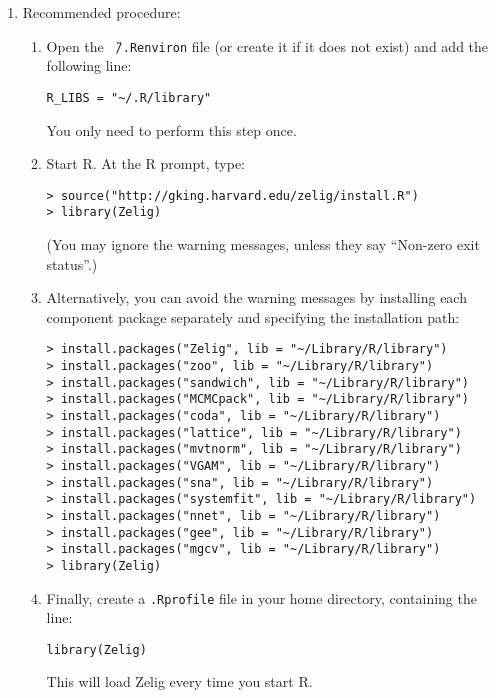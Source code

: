 \begin{enumerate}
\item Recommended procedure: 
  \begin{enumerate}
  \item Open the {\tt \~\,/.Renviron} file (or create it if it does
    not exist) and add the following line:
\begin{verbatim}
R_LIBS = "~/.R/library"
\end{verbatim}
    You only need to perform this step once.
  \item Start R.  At the R prompt, type:
\begin{verbatim}
> source("http://gking.harvard.edu/zelig/install.R")
> library(Zelig)
\end{verbatim}
(You may ignore the warning messages, unless they say ``Non-zero exit 
status''.)
\item Alternatively, you can avoid the warning messages by installing each 
component package separately and specifying the installation path:  
\begin{verbatim}
> install.packages("Zelig", lib = "~/Library/R/library")
> install.packages("zoo", lib = "~/Library/R/library")
> install.packages("sandwich", lib = "~/Library/R/library")
> install.packages("MCMCpack", lib = "~/Library/R/library")
> install.packages("coda", lib = "~/Library/R/library")
> install.packages("lattice", lib = "~/Library/R/library")
> install.packages("mvtnorm", lib = "~/Library/R/library")
> install.packages("VGAM", lib = "~/Library/R/library")
> install.packages("sna", lib = "~/Library/R/library")
> install.packages("systemfit", lib = "~/Library/R/library")
> install.packages("nnet", lib = "~/Library/R/library")
> install.packages("gee", lib = "~/Library/R/library")
> install.packages("mgcv", lib = "~/Library/R/library")
> library(Zelig)
\end{verbatim}
\item Finally, create a {\tt .Rprofile} file in your home directory, containing the line:
\begin{verbatim}
library(Zelig)
\end{verbatim}
This will load Zelig every time you start R.  
  \end{enumerate}  


\end{enumerate}
